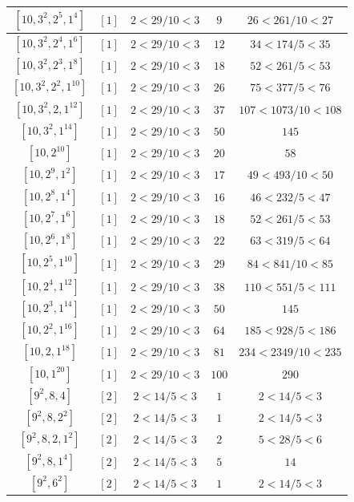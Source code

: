 \documentclass{article}%
\begin{document}
\begin{center}
\begin{longtable}{||c|c|c|c|c||}
$[10, 3^{2}, 2^{5}, 1^{4}]$ & $[1]$ & $2 < 29/10 < 3$ & $9$ & $26 < 261/10 < 27$ \\ \hline 
$[10, 3^{2}, 2^{4}, 1^{6}]$ & $[1]$ & $2 < 29/10 < 3$ & $12$ & $34 < 174/5 < 35$ \\ \hline 
$[10, 3^{2}, 2^{3}, 1^{8}]$ & $[1]$ & $2 < 29/10 < 3$ & $18$ & $52 < 261/5 < 53$ \\ \hline 
$[10, 3^{2}, 2^{2}, 1^{10}]$ & $[1]$ & $2 < 29/10 < 3$ & $26$ & $75 < 377/5 < 76$ \\ \hline 
$[10, 3^{2}, 2, 1^{12}]$ & $[1]$ & $2 < 29/10 < 3$ & $37$ & $107 < 1073/10 < 108$ \\ \hline 
$[10, 3^{2}, 1^{14}]$ & $[1]$ & $2 < 29/10 < 3$ & $50$ & $145$ \\ \hline 
$[10, 2^{10}]$ & $[1]$ & $2 < 29/10 < 3$ & $20$ & $58$ \\ \hline 
$[10, 2^{9}, 1^{2}]$ & $[1]$ & $2 < 29/10 < 3$ & $17$ & $49 < 493/10 < 50$ \\ \hline 
$[10, 2^{8}, 1^{4}]$ & $[1]$ & $2 < 29/10 < 3$ & $16$ & $46 < 232/5 < 47$ \\ \hline 
$[10, 2^{7}, 1^{6}]$ & $[1]$ & $2 < 29/10 < 3$ & $18$ & $52 < 261/5 < 53$ \\ \hline 
$[10, 2^{6}, 1^{8}]$ & $[1]$ & $2 < 29/10 < 3$ & $22$ & $63 < 319/5 < 64$ \\ \hline 
$[10, 2^{5}, 1^{10}]$ & $[1]$ & $2 < 29/10 < 3$ & $29$ & $84 < 841/10 < 85$ \\ \hline 
$[10, 2^{4}, 1^{12}]$ & $[1]$ & $2 < 29/10 < 3$ & $38$ & $110 < 551/5 < 111$ \\ \hline 
$[10, 2^{3}, 1^{14}]$ & $[1]$ & $2 < 29/10 < 3$ & $50$ & $145$ \\ \hline 
$[10, 2^{2}, 1^{16}]$ & $[1]$ & $2 < 29/10 < 3$ & $64$ & $185 < 928/5 < 186$ \\ \hline 
$[10, 2, 1^{18}]$ & $[1]$ & $2 < 29/10 < 3$ & $81$ & $234 < 2349/10 < 235$ \\ \hline 
$[10, 1^{20}]$ & $[1]$ & $2 < 29/10 < 3$ & $100$ & $290$ \\ \hline 
$[9^{2}, 8, 4]$ & $[2]$ & $2 < 14/5 < 3$ & $1$ & $2 < 14/5 < 3$ \\ \hline 
$[9^{2}, 8, 2^{2}]$ & $[2]$ & $2 < 14/5 < 3$ & $1$ & $2 < 14/5 < 3$ \\ \hline 
$[9^{2}, 8, 2, 1^{2}]$ & $[2]$ & $2 < 14/5 < 3$ & $2$ & $5 < 28/5 < 6$ \\ \hline 
$[9^{2}, 8, 1^{4}]$ & $[2]$ & $2 < 14/5 < 3$ & $5$ & $14$ \\ \hline 
$[9^{2}, 6^{2}]$ & $[2]$ & $2 < 14/5 < 3$ & $1$ & $2 < 14/5 < 3$ \\ \hline 

\end{longtable}
\end{center}
\end{document}
